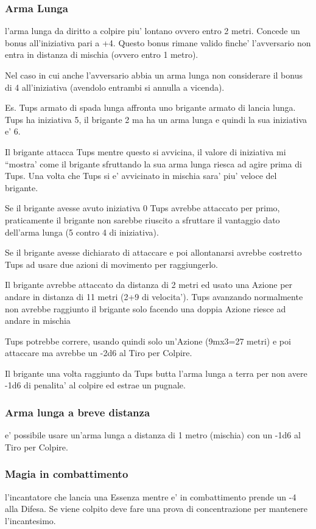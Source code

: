 \documentclass[a4paper,11pt,twoside,openany]{dndbook}
\begin{document}
\subsubsection{Arma Lunga} l'arma lunga da diritto a colpire piu' lontano ovvero entro 2 metri. Concede un bonus all'iniziativa pari a +4. Questo bonus rimane valido finche' l'avversario non entra in distanza di mischia (ovvero entro 1 metro).

Nel caso in cui anche l'avversario abbia un arma lunga non considerare il bonus di 4 all'iniziativa (avendolo entrambi si annulla a vicenda).

Es. Tups armato di spada lunga affronta uno brigante armato di lancia lunga. Tups ha iniziativa 5, il brigante 2 ma ha un arma lunga e quindi la sua iniziativa e' 6.

Il brigante attacca Tups mentre questo si avvicina, il valore di iniziativa mi ``mostra' come il brigante sfruttando la sua arma lunga riesca ad agire prima di Tups. Una volta che Tups si e' avvicinato in mischia sara' piu' veloce del brigante.

Se il brigante avesse avuto iniziativa 0 Tups avrebbe attaccato per primo, praticamente il brigante non sarebbe riuscito a sfruttare il vantaggio dato dell'arma lunga (5 contro 4 di iniziativa).

Se il brigante avesse dichiarato di attaccare e poi allontanarsi avrebbe costretto Tups ad usare due azioni di movimento per raggiungerlo.

Il brigante avrebbe attaccato da distanza di 2 metri ed usato una Azione per andare in distanza di 11 metri (2+9 di velocita'). Tups avanzando normalmente non avrebbe raggiunto il brigante solo facendo una doppia Azione riesce ad andare in mischia

Tups potrebbe correre, usando quindi solo un'Azione (9mx3=27 metri) e poi attaccare ma avrebbe un -2d6 al Tiro per Colpire.

Il brigante una volta raggiunto da Tups butta l'arma lunga a terra per non avere -1d6 di penalita' al colpire ed estrae un pugnale.

\subsubsection{Arma lunga a breve distanza} e' possibile usare un'arma lunga a distanza di 1 metro (mischia) con un -1d6 al Tiro per Colpire.

\subsubsection{Magia in combattimento} l'incantatore che lancia una Essenza mentre e' in combattimento prende un -4 alla Difesa. Se viene colpito deve fare una prova di concentrazione per mantenere l'incantesimo.
\end{document}

